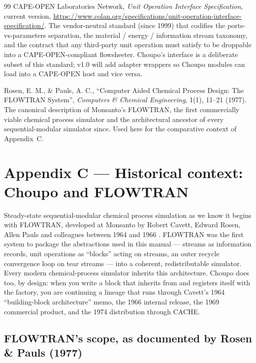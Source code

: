 \documentclass[11pt,a4paper]{article}
\begin{document}
\begin{thebibliography}{99}
 CAPE-OPEN Laboratories Network,
\emph{Unit Operation Interface Specification}, current version,
\url{https://www.colan.org/specifications/unit-operation-interface-specification/}.
The vendor-neutral standard (since 1999) that codifies the
ports-vs-parameters separation, the material / energy / information
stream taxonomy, and the contract that any third-party unit
operation must satisfy to be droppable into a CAPE-OPEN-compliant
flowsheeter.  Choupo's
 interface is a deliberate subset of this
standard; v1.0 will add adapter wrappers so Choupo modules can
load into a CAPE-OPEN host and vice versa.

 Rosen, E. M., \& Pauls, A. C., ``Computer Aided
Chemical Process Design: The FLOWTRAN System'', \emph{Computers \&
Chemical Engineering}, 1(1), 11--21 (1977). The canonical
description of Monsanto's FLOWTRAN, the first commercially viable
chemical process simulator and the architectural ancestor of every
sequential-modular simulator since.  Used here for the comparative
context of Appendix~C.

\end{thebibliography}

\clearpage
\section*{Appendix C --- Historical context: Choupo and FLOWTRAN}
{}

Steady-state sequential-modular chemical process simulation as we
know it begins with FLOWTRAN, developed at Monsanto by Robert Cavett,
Edward Rosen, Allen Pauls and colleagues between 1964 and 1966
\cite{Rosen1977}.  FLOWTRAN was the first system to package the
abstractions used in this manual --- streams as information records,
unit operations as ``blocks'' acting on streams, an outer recycle
convergence loop on tear streams --- into a coherent, redistributable
simulator.  Every modern chemical-process simulator inherits this
architecture.  Choupo does too, by design: when you write a block
that inherits from  and registers itself with the
factory, you are continuing a lineage that runs through Cavett's 1964
``building-block architecture'' memo, the 1966 internal release, the
1969 commercial product, and the 1974 distribution through CACHE.

\subsection*{FLOWTRAN's scope, as documented by Rosen \& Pauls (1977)}
\end{document}
